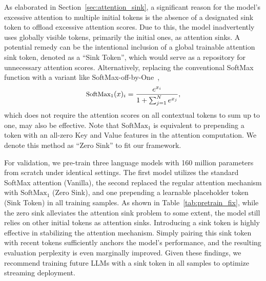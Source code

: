 As elaborated in Section~\ref{sec:attention_sink}, a significant reason for the model's excessive attention to multiple initial tokens is the absence of a designated sink token to offload excessive attention scores. Due to this, the model inadvertently uses globally visible tokens, primarily the initial ones, as attention sinks. A potential remedy can be the intentional inclusion of a global trainable attention sink token, denoted as a ``Sink Token'', which would serve as a repository for unnecessary attention scores. Alternatively, replacing the conventional SoftMax function with a variant like SoftMax-off-by-One~\citep{softmax1}, 
\begin{equation}
    \small
    \text{SoftMax}_1(x)_i = \frac{e^{x_i}}{1+\sum_{j=1}^{N} e^{x_j}},
    \label{equ:softmax1}
\end{equation}
which does not require the attention scores on all contextual tokens to sum up to one, may also be effective. Note that $\text{SoftMax}_1$ is equivalent to prepending a token with an all-zero Key and Value features in the attention computation. We denote this method as ``Zero Sink'' to fit our framework.

For validation, we pre-train three language models with 160 million parameters from scratch under identical settings. The first model utilizes the standard SoftMax attention (Vanilla), the second replaced the regular attention mechanism with $\text{SoftMax}_1$ (Zero Sink), and one prepending a learnable placeholder token (Sink Token) in all training samples. As shown in Table~\ref{tab:pretrain_fix}, while the zero sink alleviates the attention sink problem to some extent, the model still relies on other initial tokens as attention sinks. Introducing a sink token is highly effective in stabilizing the attention mechanism. Simply pairing this sink token with recent tokens sufficiently anchors the model's performance, and the resulting evaluation perplexity is even marginally improved. Given these findings, we recommend training future LLMs with a sink token in all samples to optimize streaming deployment.

